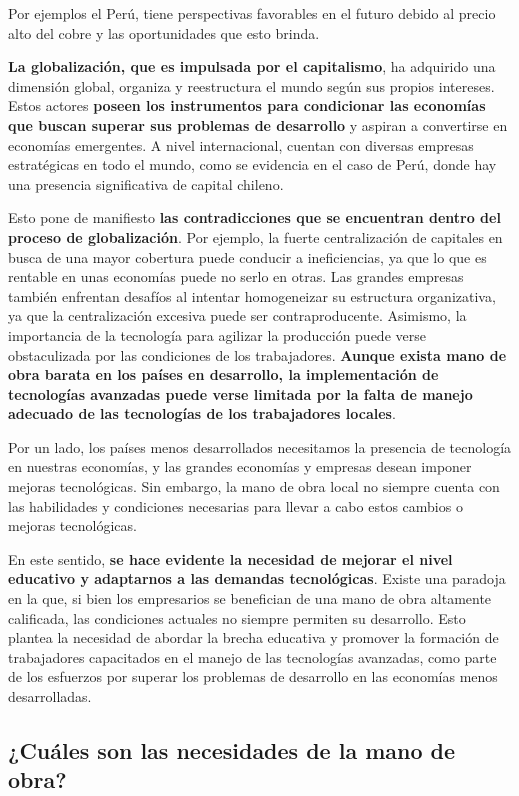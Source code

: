\documentclass[
  a4paper,
]{article}
\begin{document}
Por ejemplos el Perú, tiene perspectivas favorables en el futuro debido
al precio alto del cobre y las oportunidades que esto brinda.

\textbf{La globalización, que es impulsada por el capitalismo}, ha
adquirido una dimensión global, organiza y reestructura el mundo según
sus propios intereses. Estos actores \textbf{poseen los instrumentos
para condicionar las economías que buscan superar sus problemas de
desarrollo} y aspiran a convertirse en economías emergentes. A nivel
internacional, cuentan con diversas empresas estratégicas en todo el
mundo, como se evidencia en el caso de Perú, donde hay una presencia
significativa de capital chileno.

Esto pone de manifiesto \textbf{las contradicciones que se encuentran
dentro del proceso de globalización}. Por ejemplo, la fuerte
centralización de capitales en busca de una mayor cobertura puede
conducir a ineficiencias, ya que lo que es rentable en unas economías
puede no serlo en otras. Las grandes empresas también enfrentan desafíos
al intentar homogeneizar su estructura organizativa, ya que la
centralización excesiva puede ser contraproducente. Asimismo, la
importancia de la tecnología para agilizar la producción puede verse
obstaculizada por las condiciones de los trabajadores. \textbf{Aunque
exista mano de obra barata en los países en desarrollo, la
implementación de tecnologías avanzadas puede verse limitada por la
falta de manejo adecuado de las tecnologías de los trabajadores
locales}.

Por un lado, los países menos desarrollados necesitamos la presencia de
tecnología en nuestras economías, y las grandes economías y empresas
desean imponer mejoras tecnológicas. Sin embargo, la mano de obra local
no siempre cuenta con las habilidades y condiciones necesarias para
llevar a cabo estos cambios o mejoras tecnológicas.

En este sentido, \textbf{se hace evidente la necesidad de mejorar el
nivel educativo y adaptarnos a las demandas tecnológicas}. Existe una
paradoja en la que, si bien los empresarios se benefician de una mano de
obra altamente calificada, las condiciones actuales no siempre permiten
su desarrollo. Esto plantea la necesidad de abordar la brecha educativa
y promover la formación de trabajadores capacitados en el manejo de las
tecnologías avanzadas, como parte de los esfuerzos por superar los
problemas de desarrollo en las economías menos desarrolladas.

\subsection{¿Cuáles son las necesidades de la mano de
obra?}\label{cuuxe1les-son-las-necesidades-de-la-mano-de-obra}
\end{document}

